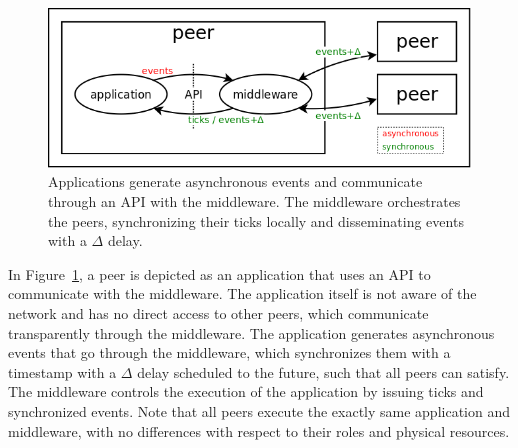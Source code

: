 \documentclass[fleqn,10pt]{SelfArx}
\begin{document}
\begin{figure}
  \centering
  \includegraphics[width=\linewidth]{middleware}
  \caption{
    Applications generate asynchronous events and communicate through an API
    with the middleware.
    The middleware orchestrates the peers, synchronizing their ticks locally
    and disseminating events with a $\Delta$ delay.
    \label{fig.middleware}
  }
\end{figure}

In Figure~\ref{fig.middleware}, a peer is depicted as an application that uses
an API to communicate with the middleware.
The application itself is not aware of the network and has no direct access to
other peers, which communicate transparently through the middleware.
The application generates asynchronous events that go through the middleware,
which synchronizes them with a timestamp with a $\Delta$ delay scheduled to the
future, such that all peers can satisfy.
The middleware controls the execution of the application by issuing ticks and
synchronized events.
Note that all peers execute the exactly same application and middleware, with
no differences with respect to their roles and physical resources.
\end{document}
